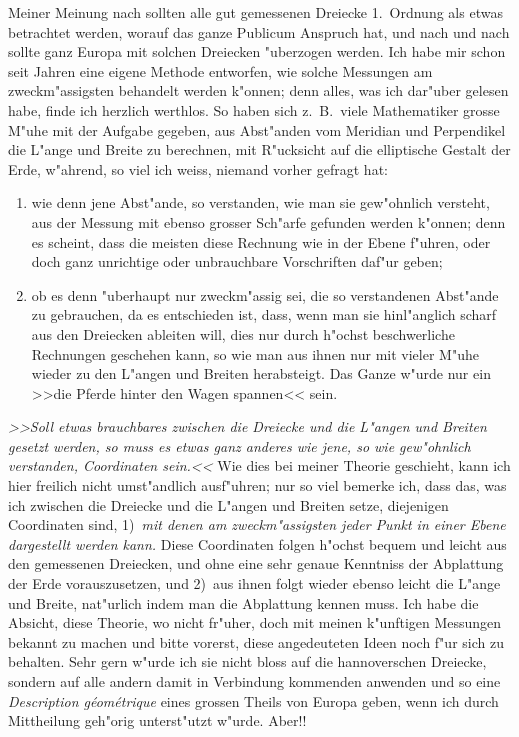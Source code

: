 \documentclass[12pt,a4paper]{article}
\theoremstyle{plain}
\theoremstyle{definition}
\theoremstyle{remark}
\begin{document}
Meiner Meinung nach sollten alle gut gemessenen Dreiecke 1.\ Ordnung als etwas betrachtet werden, worauf das ganze Publicum Anspruch hat, und nach und nach sollte ganz Europa mit solchen Dreiecken "uberzogen werden. Ich habe mir schon seit Jahren eine eigene Methode entworfen, wie solche Messungen am zweckm"assigsten behandelt werden k"onnen; denn alles, was ich dar"uber gelesen habe, finde ich herzlich werthlos. So haben sich z.\ B.\ viele Mathematiker grosse M"uhe mit der Aufgabe gegeben, aus Abst"anden vom Meridian und Perpendikel die L"ange und Breite zu berechnen, mit R"ucksicht auf die elliptische Gestalt der Erde, w"ahrend, so viel ich weiss, niemand vorher gefragt hat:
\begin{enumerate}[label=\arabic*.]
\item wie denn jene Abst"ande, so verstanden, wie man sie gew"ohnlich versteht, aus der Messung mit ebenso grosser Sch"arfe gefunden werden k"onnen; denn es scheint, dass die meisten diese Rechnung wie in der Ebene f"uhren, oder doch ganz unrichtige oder unbrauchbare Vorschriften daf"ur geben;
\item ob es denn "uberhaupt nur zweckm"assig sei, die so verstandenen Abst"ande zu gebrauchen, da es entschieden ist, dass, wenn man sie hinl"anglich scharf aus den Dreiecken ableiten will, dies nur durch h"ochst beschwerliche Rechnungen geschehen kann, so wie man aus ihnen nur mit vieler M"uhe wieder zu den L"angen und Breiten herabsteigt. Das Ganze w"urde nur ein >>die Pferde hinter den Wagen spannen<< sein.
\end{enumerate}
\emph{>>Soll etwas brauchbares zwischen die Dreiecke und die L"angen und Breiten gesetzt werden, so muss es etwas ganz anderes wie jene, so wie gew"ohnlich verstanden, Coordinaten sein.<<} Wie dies bei meiner Theorie geschieht, kann ich hier freilich nicht umst"andlich ausf"uhren; nur so viel bemerke ich, dass das, was ich zwischen die Dreiecke und die L"angen und Breiten setze, diejenigen Coordinaten sind, 1)~\emph{mit denen am zweckm"assigsten jeder Punkt in einer Ebene dargestellt werden kann.} Diese Coordinaten folgen h"ochst bequem und leicht aus den gemessenen Dreiecken, und ohne eine sehr genaue Kenntniss der Abplattung der Erde vorauszusetzen, und 2)~aus ihnen folgt wieder ebenso leicht die L"ange und Breite, nat"urlich indem man die Abplattung kennen muss. Ich habe die Absicht, diese Theorie, wo nicht fr"uher, doch mit meinen k"unftigen Messungen bekannt zu machen und bitte vorerst, diese angedeuteten Ideen noch f"ur sich zu behalten. Sehr gern w"urde ich sie nicht bloss auf die hannoverschen Dreiecke, sondern auf alle andern damit in Verbindung kommenden anwenden und so eine \emph{Description g\'{e}om\'{e}trique} eines grossen Theils von Europa geben, wenn ich durch Mittheilung geh"orig unterst"utzt w"urde. Aber!!
\end{document}
